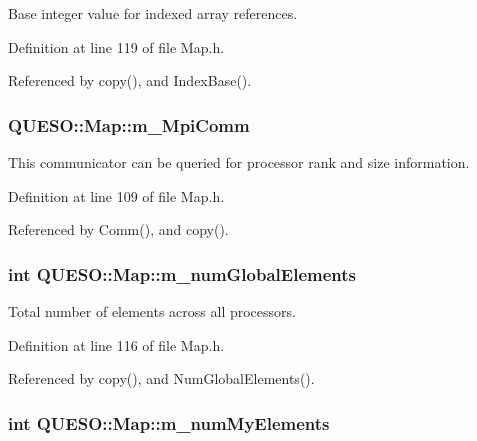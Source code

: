 Base integer value for indexed array references. 



Definition at line 119 of file Map.\-h.



Referenced by copy(), and Index\-Base().

\hypertarget{class_q_u_e_s_o_1_1_map_aa002700b90ae2edbf5b3ee6968b28c50}{
\subsubsection[{m\-\_\-\-Mpi\-Comm}]{ Q\-U\-E\-S\-O\-::\-Map\-::m\-\_\-\-Mpi\-Comm\hspace{0.3cm}{\ttfamily [private]}}}\label{class_q_u_e_s_o_1_1_map_aa002700b90ae2edbf5b3ee6968b28c50}


This communicator can be queried for processor rank and size information. 



Definition at line 109 of file Map.\-h.



Referenced by Comm(), and copy().

\hypertarget{class_q_u_e_s_o_1_1_map_a67c0e876f9c6e9dcf9eba45d34c02b0a}{
\subsubsection[{m\-\_\-num\-Global\-Elements}]{\setlength{\rightskip}{0pt plus 5cm}int Q\-U\-E\-S\-O\-::\-Map\-::m\-\_\-num\-Global\-Elements\hspace{0.3cm}{\ttfamily [private]}}}\label{class_q_u_e_s_o_1_1_map_a67c0e876f9c6e9dcf9eba45d34c02b0a}


Total number of elements across all processors. 



Definition at line 116 of file Map.\-h.



Referenced by copy(), and Num\-Global\-Elements().

\hypertarget{class_q_u_e_s_o_1_1_map_afdde1747848ac8dd3cebf8eed159de82}{
\subsubsection[{m\-\_\-num\-My\-Elements}]{\setlength{\rightskip}{0pt plus 5cm}int Q\-U\-E\-S\-O\-::\-Map\-::m\-\_\-num\-My\-Elements\hspace{0.3cm}{\ttfamily [private]}}}\label{class_q_u_e_s_o_1_1_map_afdde1747848ac8dd3cebf8eed159de82}


